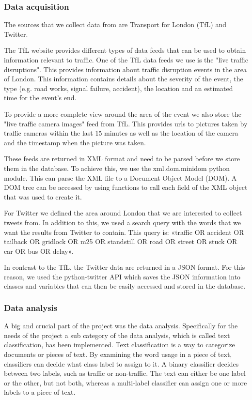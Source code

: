 ﻿\subsubsection{Data acquisition}
The sources that we collect data from are Transport for London (TfL) and Twitter.

The TfL website provides different types of data feeds that can be used to obtain information relevant to traffic. 
One of the TfL data feeds we use is the "live traffic disruptions". This provides information about traffic disruption events in the area of London. This information contains details about the severity of the event, the type (e.g. road works, signal failure, accident), the location and an estimated time for the event's end.

To provide a more complete view around the area of the event we also store the "live traffic camera images" feed from TfL. This provides urls to pictures taken by traffic cameras within the last 15 minutes as well as the location of the camera and the timestamp when the picture was taken.

These feeds are returned in XML format and need to be parsed before we store them in the database. To achieve this, we use the xml.dom.minidom python module. This can parse the XML file to a Document Object Model (DOM). A DOM tree can be accessed by using functions to call each field of the XML object that was used to create it.

For Twitter we defined the area around London that we are interested to collect tweets from. In addition to this, we used a search query with the words that we want the results from Twitter to contain. This query is:  «traffic OR accident OR tailback OR gridlock OR m25 OR standstill OR road OR street OR stuck OR car OR bus OR delay». 

In contrast to the TfL, the Twitter data are returned in a JSON format. For this reason, we used the python-twitter API which saves the JSON information into classes and variables that can then be easily accessed and stored in the database.

\subsubsection{Data analysis}
A big and crucial part of the project was the data analysis. Specifically for the needs of the project a sub category of the data analysis, which is called text classification, has been implemented. Text classification is a way to categorize documents or pieces of text. By examining the word usage in a piece of text, classifiers can decide what class label to assign to it. A binary classifier decides between two labels, such as traffic or non-traffic. The text can either be one label or the other, but not both, whereas a multi-label classifier can assign one or more labels to a piece of text.


